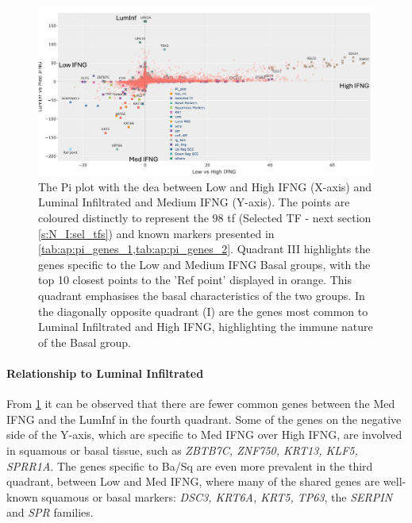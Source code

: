 \begin{figure}[H]    
    \centering
    \includegraphics[width=1.0\textwidth,keepaspectratio]{Sections/ClusteringAnalysis/Resources/discussion/basal_inf_pi.png}
    \caption[Pi plot - basal groups and immune infiltration]{The Pi plot with the \acrshort{dea} between Low and High IFNG (X-axis) and Luminal Infiltrated and Medium IFNG (Y-axis). The points are coloured distinctly to represent the 98 \acrlong{tf} (Selected TF - next section \cref{s:N_I:sel_tfs}) and known markers presented in \cref{tab:ap:pi_genes_1,tab:ap:pi_genes_2}. Quadrant III highlights the genes specific to the Low and Medium IFNG Basal groups, with the top 10 closest points to the 'Ref point' displayed in orange. This quadrant emphasises the basal characteristics of the two groups. In the diagonally opposite quadrant (I) are the genes most common to Luminal Infiltrated and High IFNG, highlighting the immune nature of the Basal group.}
    \label{fig:cs:pi_basal_inf}
\end{figure}


\paragraph*{Relationship to Luminal Infiltrated}

From \cref{fig:cs:pi_basal_inf} it can be observed that there are fewer common genes between the Med IFNG and the LumInf in the fourth quadrant. Some of the genes on the negative side of the Y-axis, which are specific to Med IFNG over High IFNG, are involved in squamous or basal tissue, such as \textit{ZBTB7C, ZNF750, KRT13, KLF5, SPRR1A}. The genes specific to Ba/Sq are even more prevalent in the third quadrant, between Low and Med IFNG, where many of the shared genes are well-known squamous or basal markers: \textit{DSC3, KRT6A, KRT5, TP63}, the \textit{SERPIN} and \textit{SPR} families.


